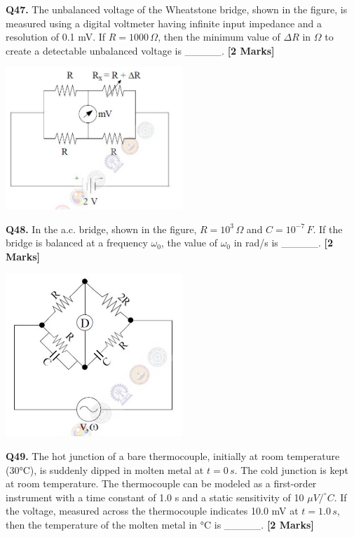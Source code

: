 \documentclass[11pt]{article}
\newcommand{\questionb}[2]{
    \noindent\textbf{Q#2.} #1 \hfill \textbf{[2 Marks]}
}
\begin{document}
\questionb{The unbalanced voltage of the Wheatstone bridge, shown in the figure, is measured using a digital voltmeter having infinite input impedance and a resolution of 0.1 mV. If \( R = 1000 \, \Omega \), then the minimum value of \(\Delta R\) in \(\Omega\) to create a detectable unbalanced voltage is \_\_\_\_\_.}{47}
\begin{center}
\includegraphics[width=0.5\textwidth]{figures/47.png}
\end{center}
\vspace{0.5cm}

\questionb{In the a.c. bridge, shown in the figure, \( R = 10^3 \, \Omega \) and \( C = 10^{-7} \, F \). If the bridge is balanced at a frequency \( \omega_0 \), the value of \( \omega_0 \) in rad/s is \_\_\_\_\_.}{48}
\begin{center}
\includegraphics[width=0.5\textwidth]{figures/48.png}
\end{center}
\vspace{0.5cm}

\questionb{The hot junction of a bare thermocouple, initially at room temperature (30°C), is suddenly dipped in molten metal at \( t = 0 \, s \). The cold junction is kept at room temperature. The thermocouple can be modeled as a first-order instrument with a time constant of 1.0 s and a static sensitivity of 10 \(\mu V/^\circ C\). If the voltage, measured across the thermocouple indicates 10.0 mV at \( t = 1.0 \, s \), then the temperature of the molten metal in °C is \_\_\_\_\_.}{49}
\vspace{0.5cm}
\end{document}
